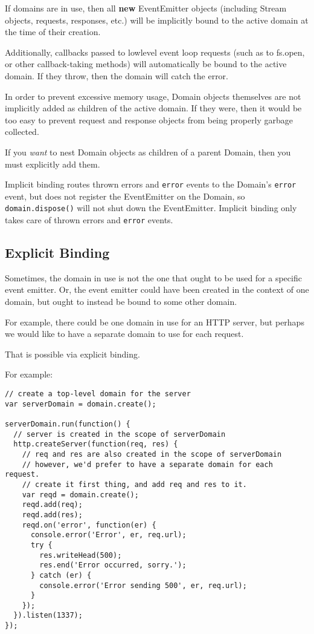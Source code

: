 If domains are in use, then all \textbf{new} EventEmitter objects
(including Stream objects, requests, responses, etc.) will be implicitly
bound to the active domain at the time of their creation.

Additionally, callbacks passed to lowlevel event loop requests (such as
to fs.open, or other callback-taking methods) will automatically be
bound to the active domain. If they throw, then the domain will catch
the error.

In order to prevent excessive memory usage, Domain objects themselves
are not implicitly added as children of the active domain. If they were,
then it would be too easy to prevent request and response objects from
being properly garbage collected.

If you \emph{want} to nest Domain objects as children of a parent
Domain, then you must explicitly add them.

Implicit binding routes thrown errors and
\texttt{\textquotesingle{}error\textquotesingle{}} events to the
Domain's \texttt{error} event, but does not register the EventEmitter on
the Domain, so \texttt{domain.dispose()} will not shut down the
EventEmitter. Implicit binding only takes care of thrown errors and
\texttt{\textquotesingle{}error\textquotesingle{}} events.

\subsection{Explicit Binding}\label{explicit-binding}

Sometimes, the domain in use is not the one that ought to be used for a
specific event emitter. Or, the event emitter could have been created in
the context of one domain, but ought to instead be bound to some other
domain.

For example, there could be one domain in use for an HTTP server, but
perhaps we would like to have a separate domain to use for each request.

That is possible via explicit binding.

For example:

\begin{verbatim}
// create a top-level domain for the server
var serverDomain = domain.create();

serverDomain.run(function() {
  // server is created in the scope of serverDomain
  http.createServer(function(req, res) {
    // req and res are also created in the scope of serverDomain
    // however, we'd prefer to have a separate domain for each request.
    // create it first thing, and add req and res to it.
    var reqd = domain.create();
    reqd.add(req);
    reqd.add(res);
    reqd.on('error', function(er) {
      console.error('Error', er, req.url);
      try {
        res.writeHead(500);
        res.end('Error occurred, sorry.');
      } catch (er) {
        console.error('Error sending 500', er, req.url);
      }
    });
  }).listen(1337);
});
\end{verbatim}

